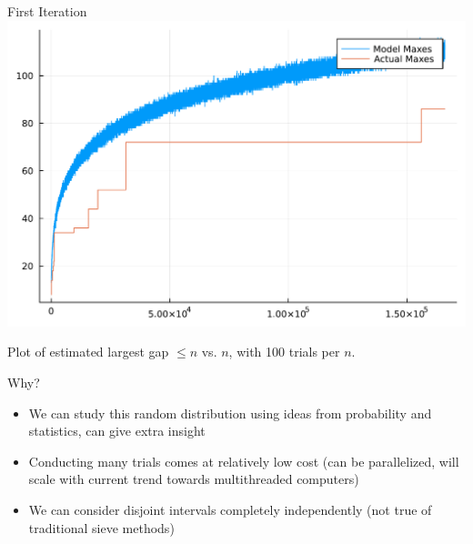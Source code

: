 \documentclass{beamer}
\begin{document}
\begin{frame}{First Iteration}
  \includegraphics[width=\textwidth]{random-plot1.pdf}

  Plot of estimated largest gap $\le n$ vs. $n$, with
  100 trials per $n$.
\end{frame}

\begin{frame}{Why?}
  \begin{itemize}
    \item We can study this random distribution using ideas from probability and statistics, can give extra insight
    \item Conducting many trials comes at relatively low cost (can be parallelized, will scale with current trend towards multithreaded computers)
    \item We can consider disjoint intervals completely independently (not true of traditional sieve methods)
  \end{itemize}
\end{frame}
\end{document}
